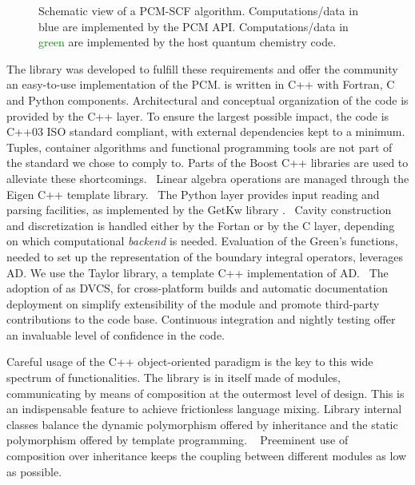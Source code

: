 \begin{figure}[tb]
\centering
\scalebox{0.7}{}
\caption[Modular approach to programming a \acs{PCM} functionality into an existing \acs{SCF} code.]{
Schematic view of a \acs{PCM}-\acs{SCF} algorithm. Computations/data in
\textcolor{PMS2229}{blue} are implemented by the \acs{PCM} \acs{API}.
Computations/data in \textcolor{Green}{green} are implemented by the
host quantum chemistry code.
  }
\label{fig:algorithm}
\end{figure}

The \pcmsolver library was developed to fulfill these requirements and
offer the community an easy-to-use implementation of the \acs{PCM}.
\pcmsolver is written in C++ with Fortran, C and Python components.
Architectural and conceptual organization of the code is provided by the
C++ layer. To ensure the largest possible impact, the code is C++03 ISO standard
compliant, with external dependencies kept to a minimum.
Tuples, container algorithms and functional programming tools are not
part of the standard we chose to comply to.
Parts of the Boost C++ libraries are used to alleviate these
shortcomings.~\autocite{boost}
Linear algebra operations are managed through the Eigen C++ template
library.~\autocite{eigen}
The Python layer provides input reading and parsing facilities,
as implemented by the GetKw library .~\autocite{libgetkw}
Cavity construction and discretization is handled either by the Fortan
or by the C layer, depending on which computational \emph{backend} is
needed.
Evaluation of the Green's functions, needed to set up the representation
of the boundary integral operators, leverages \ac{AD}. We use the Taylor library, a template C++
implementation of \acs{AD}.~\autocite{Bartholomew-Biggs2000-db, libtaylor}
The adoption of \git as \acs{DVCS}, \cmake for cross-platform builds and
automatic documentation deployment on \readthedocs simplify
extensibility of the module and promote third-party contributions to the
code base. Continuous integration and nightly testing offer an
invaluable level of confidence in the code.

Careful usage of the C++ object-oriented paradigm is the key to this
wide spectrum of functionalities. The library is in itself made of
modules, communicating by means of composition at the outermost
level of design.
This is an indispensable feature to achieve frictionless language
mixing.
Library internal classes balance the dynamic polymorphism offered by
inheritance and the static polymorphism offered by template programming.
~\autocite{Alexandrescu2001-bp, Sutter2004-nt, Langr2012-js}
Preeminent use of composition over inheritance keeps the coupling
between different modules as low as possible.~\autocite{Gamma1995-fd}

